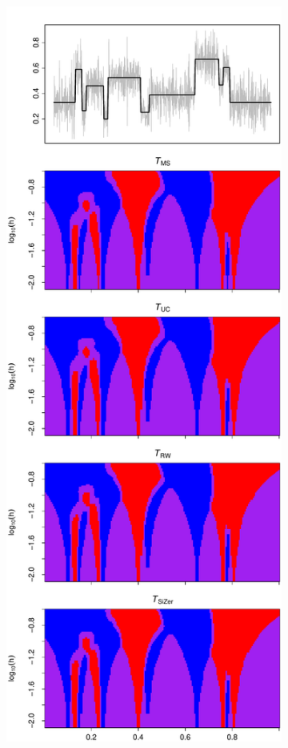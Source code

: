 \begin{figure}[p]
\begin{subfigure}[b]{0.475\textwidth}
\includegraphics[width=\textwidth]{Plots/SiZer_map_T_1000_blocks_a1_-50.pdf}

\end{subfigure}
\end{figure}

